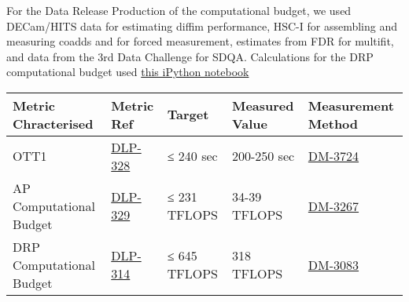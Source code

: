 For the Data Release Production of the computational budget, we used
DECam/HITS data for estimating diffim performance, HSC-I for assembling
and measuring coadds and for forced measurement, estimates from FDR for
multifit, and data from the 3rd Data Challenge for SDQA. Calculations
for the DRP computational budget used
\href{https://github.com/lsst-dm/kpm/blob/29c053f7b832e8bd999527e012681826fc0c201c/DLP-314:\%20DRP\%20Computational\%20Budget/LSST\%20DRP\%20Computational\%20Budget.ipynb}{this
iPython notebook}

\begin{longtable}[]{@{}lllll@{}}
\toprule
\textbf{Metric Chracterised} & \textbf{Metric Ref} & \textbf{Target} &
\textbf{Measured Value} & \textbf{Measurement Method}\tabularnewline
\midrule
\endhead
OTT1 & \href{https://jira.lsstcorp.org/browse/DLP-328}{DLP-328} & ≤ 240
sec & 200-250 sec &
\href{https://jira.lsstcorp.org/browse/DM-3724}{DM-3724}\tabularnewline
AP Computational Budget &
\href{https://jira.lsstcorp.org/browse/DLP-329}{DLP-329} & ≤ 231 TFLOPS
& 34-39 TFLOPS &
\href{https://jira.lsstcorp.org/browse/DM-3267}{DM-3267}\tabularnewline
DRP Computational Budget &
\href{https://jira.lsstcorp.org/browse/DLP-314}{DLP-314} & ≤ 645 TFLOPS
& 318 TFLOPS &
\href{https://jira.lsstcorp.org/browse/DM-3083}{DM-3083}\tabularnewline
\bottomrule
\end{longtable}

~

~
